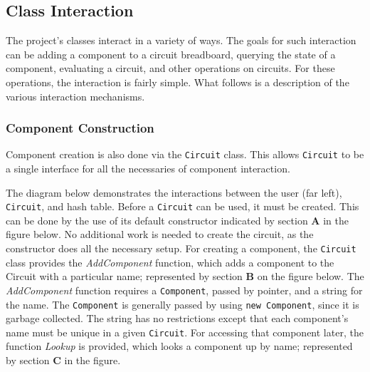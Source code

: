 \documentclass{article}
\newcommand{\Bold}[1]{\textbf{#1}}
\newcommand{\ClassName}[1]{\texttt{#1}}
\newcommand{\FunctionName}[1]{\textit{#1}}
\begin{document}
\subsection{Class Interaction}

The project's classes interact in a variety of ways. The goals for such interaction can be adding a component to a circuit breadboard, querying the state of a component, evaluating a circuit, and other operations on circuits. For these operations, the interaction is fairly simple. What follows is a description of the various interaction mechanisms.

\subsubsection{Component Construction}

Component creation is also done via the \ClassName{Circuit} class. This allows \ClassName{Circuit} to be a single interface for all the necessaries of component interaction.

The diagram below demonstrates the interactions between the user (far left), \ClassName{Circuit}, and hash table. Before a \ClassName{Circuit} can be used, it must be created. This can be done by the use of its default constructor indicated by section \Bold{A} in the figure below. No additional work is needed to create the circuit, as the constructor does all the necessary setup. For creating a component, the \ClassName{Circuit} class provides the \FunctionName{AddComponent} function, which adds a component to the Circuit with a particular name; represented by section \Bold{B} on the figure below. The \FunctionName{AddComponent} function requires a \ClassName{Component}, passed by pointer, and a string for the name. The \ClassName{Component} is generally passed by using \ClassName{new Component}, since it is garbage collected. The string has no restrictions except that each component’s name must be unique in a given \ClassName{Circuit}. For accessing that component later, the function \FunctionName{Lookup} is
provided, which looks a component up by name; represented by section \Bold{C} in the figure.
\end{document}
